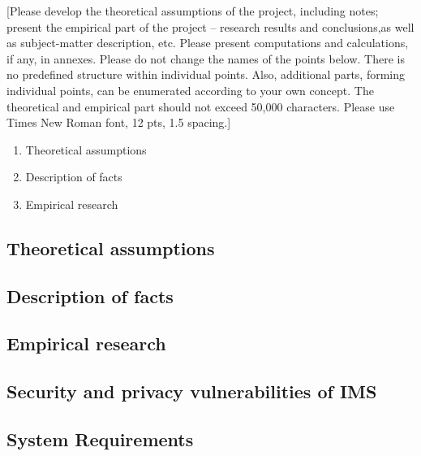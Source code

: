 [Please develop the theoretical assumptions of the project, including notes;
present the empirical part of the project -- research results and conclusions,as well as subject-matter description, etc.
Please present computations and calculations, if any, in annexes.
Please do not change the names of the points below.
There is no predefined structure within individual points.
Also, additional parts, forming individual points, can be enumerated according to your own concept.
The theoretical and empirical part should not exceed 50,000 characters.
Please use Times New Roman font, 12 pts, 1.5 spacing.]
\begin{enumerate}
    \item Theoretical assumptions
    \item Description of facts
    \item Empirical research
\end{enumerate}

\subsection{Theoretical assumptions}\label{subsec:theoretical-assumptions}


\subsection{Description of facts}\label{subsec:description-of-facts}


\subsection{Empirical research}\label{subsec:empirical-research}


\subsection{Security and privacy vulnerabilities of IMS}\label{subsec:security-and-privacy-vulnerabilities-of-ims}


\subsection{System Requirements}\label{subsec:system-requirements}


